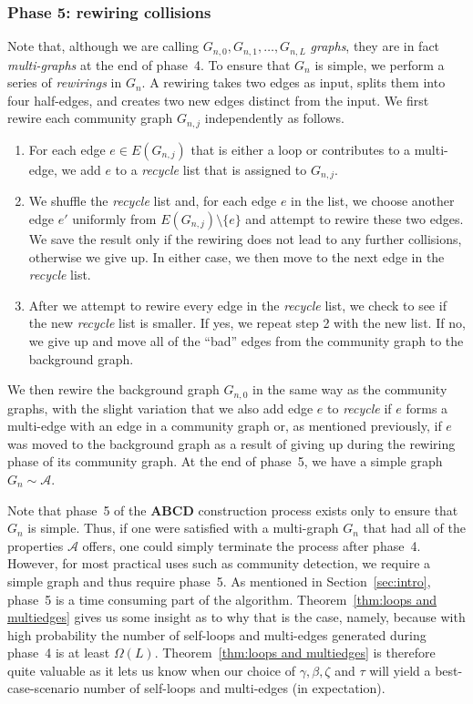 \documentclass[12pt]{article}
\theoremstyle{definition}
\theoremstyle{remark}
\theoremstyle{remark}
\numberwithin{theorem}{section}
\newcommand{\abcdDist}{\ensuremath{\mathcal{A}}}
\begin{document}
\subsubsection*{Phase 5: rewiring collisions}
Note that, although we are calling $G_{n,0},G_{n,1},\dots,G_{n,L}$ \textit{graphs}, they are in fact \textit{multi-graphs} at the end of phase~4. To ensure that $G_n$ is simple, we perform a series of \textit{rewirings} in $G_n$. A rewiring takes two edges as input, splits them into four half-edges, and creates two new edges distinct from the input. We first rewire each community graph $G_{n,j}$ independently as follows.
\begin{enumerate}
\item For each edge $e \in E(G_{n,j})$ that is either a loop or contributes to a multi-edge, we add $e$ to a \textit{recycle} list that is assigned to $G_{n,j}$.
\item We shuffle the \textit{recycle} list and, for each edge $e$ in the list, we choose another edge $e'$ uniformly from $E(G_{n,j}) \setminus \{e\}$ and attempt to rewire these two edges. We save the result only if the rewiring does not lead to any further collisions, otherwise we give up. In either case, we then move to the next edge in the \textit{recycle} list.
\item After we attempt to rewire every edge in the \textit{recycle} list, we check to see if the new \textit{recycle} list is smaller. If yes, we repeat step 2 with the new list. If no, we give up and move all of the ``bad'' edges from the community graph to the background graph. 
\end{enumerate}
We then rewire the background graph $G_{n,0}$ in the same way as the community graphs, with the slight variation that we also add edge $e$ to \textit{recycle} if $e$ forms a multi-edge with an edge in a community graph or, as mentioned previously, if $e$ was moved to the background graph as a result of giving up during the rewiring phase of its community graph. At the end of phase~5, we have a simple graph $G_n \sim \abcdDist$.

\bigskip

Note that phase~5 of the \textbf{ABCD} construction process exists only to ensure that $G_n$ is simple. Thus, if one were satisfied with a multi-graph $G_n$ that had all of the properties $\abcdDist$ offers, one could simply terminate the process after phase~4. However, for most practical uses such as community detection, we require a simple graph and thus require phase~5. As mentioned in Section~\ref{sec:intro}, phase~5 is a time consuming part of the algorithm. Theorem~\ref{thm:loops and multiedges} gives us some insight as to why that is the case, namely, because with high probability the number of self-loops and multi-edges generated during phase~4 is at least $\Omega(L)$. Theorem~\ref{thm:loops and multiedges} is therefore quite valuable as it lets us know when our choice of $\gamma,\beta,\zeta$ and $\tau$ will yield a best-case-scenario number of self-loops and multi-edges (in expectation).
\end{document}
